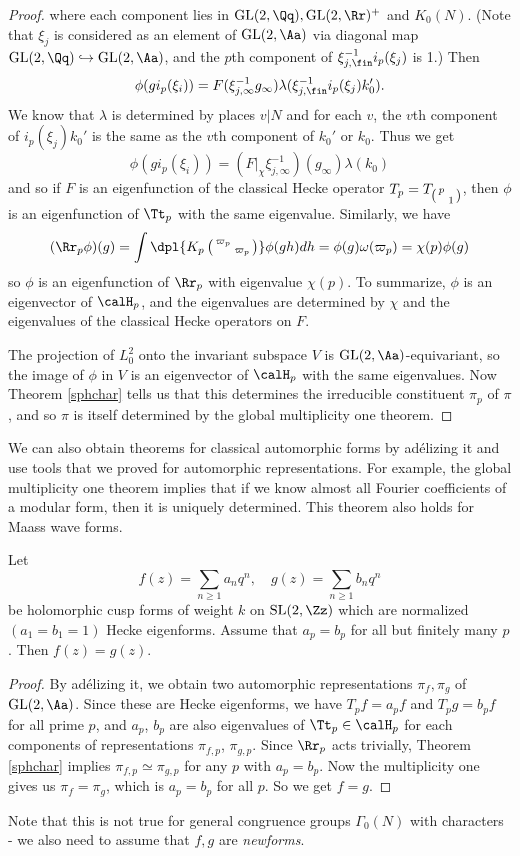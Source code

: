\begin{proof}
where each component lies in $\GL(2, \Qq), \GL(2, \Rr)^{+}$ and $K_{0}(N)$. (Note that $\xi_{j}$ is considered as an element of $\GL(2, \Aa)$ via diagonal map $\GL(2, \Qq)\hookrightarrow \GL(2, \Aa)$, and the $p$th component of $\xi_{j, \fin}^{-1}i_{p}(\xi_j)$ is 1.)
Then 
$$\phi(g i_{p}(\xi_{i})) = F(\xi_{j, \infty}^{-1}g_{\infty}) \lambda(\xi_{j, \fin}^{-1} i_{p}(\xi_j) k_{0}').$$
We know that $\lambda$ is determined by places $v|N$ and for each $v$, the $v$th component of $i_{p}(\xi_{j})k_{0}'$ is the same as the $v$th component of $k_{0}'$ or $k_{0}$. 
Thus we get
$$
\phi(gi_{p}(\xi_{i})) = (F|_{\chi}\xi_{j, \infty}^{-1})(g_{\infty})\lambda(k_{0})
$$
and so if $F$ is an eigenfunction of the classical Hecke operator $T_{p} = T_{\left(\begin{smallmatrix} p &  \\  & 1 \end{smallmatrix}\right)}$, then $\phi$ is an eigenfunction of $\Tt_p$ with the same eigenvalue. 
Similarly, we have
$$
(\Rr_{p}\phi)(g) = \int\dpl{K_{p}\smat{\varpi_{p}}{}{}{\varpi_{p}}} \phi(gh)dh = \phi(g) \omega(\varpi_{p}) = \chi(p)\phi(g)
$$
so $\phi$ is an eigenfunction of $\Rr_{p}$ with eigenvalue $\chi(p)$. 
To summarize, $\phi$ is an eigenvector of $\calH_{p}$, and the eigenvalues are determined by $\chi$ and the eigenvalues of the classical Hecke operators on $F$. 

The projection of $L_{0}^{2}$ onto the invariant subspace $V$ is $\GL(2, \Aa)$-equivariant, so the image of $\phi$ in $V$ is an eigenvector of $\calH_p$ with the same eigenvalues. 
Now Theorem \ref{sphchar} tells us that this determines the irreducible constituent $\pi_{p}$ of $\pi$, and so $\pi$ is itself determined by the global multiplicity one theorem. 
\end{proof}

We can also obtain theorems for classical automorphic forms by ad\'elizing it and use tools that we proved for automorphic representations. 
For example, the global multiplicity one theorem implies that if we know almost all Fourier coefficients of a modular form, then it is uniquely determined. This theorem also holds for Maass wave forms. 
\begin{theorem}
Let $$f(z)= \sum_{n\geq 1} a_{n}q^{n}, \quad g(z) = \sum_{n\geq 1} b_{n}q^{n}$$ be holomorphic cusp forms of weight $k$ on $\SL(2, \Zz)$ which are normalized $(a_{1} = b_{1} = 1)$ Hecke eigenforms. 
Assume that $a_{p} = b_{p}$ for all but finitely many $p$. 
Then $f(z) = g(z)$. 
\end{theorem}
\begin{proof}
By ad\'elizing it, we obtain two automorphic representations $\pi_{f}, \pi_{g}$ of $\GL(2, \Aa)$. 
Since these are Hecke eigenforms, we have $T_{p}f = a_{p}f$ and $T_{p}g = b_{p}f$ for all prime $p$, and $a_{p}$, $b_{p}$ are also eigenvalues of $\Tt_{p} \in \calH_{p}$ for each components of representations $\pi_{f, p}$, $\pi_{g, p}$. Since $\Rr_{p}$ acts trivially, Theorem \ref{sphchar} implies $\pi_{f, p} \simeq \pi_{g, p}$ for any $p$ with $a_{p}= b_{p}$. Now the multiplicity one gives us $\pi_{f} = \pi_{g}$, which is $a_{p}= b_{p}$ for all $p$. So we get $f = g$. 
\end{proof}
Note that this is not true for general congruence groups $\Gamma_{0}(N)$ with characters - we also need to assume that $f, g$ are \emph{newforms}. 

